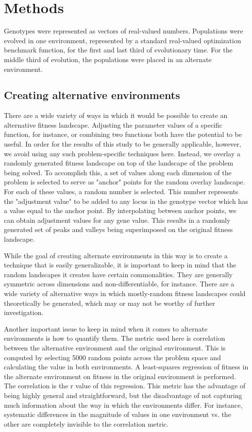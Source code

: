 \documentclass{sig-alternate}
\begin{document}
\section{Methods}
Genotypes were represented as vectors of real-valued numbers. Populations were evolved in one environment, represented by a standard real-valued optimization benchmark function, for the first and last third of evolutionary time. For the middle third of evolution, the populations were placed in an alternate environment.

\subsection{Creating alternative environments}
There are a wide variety of ways in which it would be possible to create an alternative fitness landscape. Adjusting the parameter values of a specific function, for instance, or combining two functions both have the potential to be useful. In order for the results of this study to be generally applicable, however, we avoid using any such problem-specific techniques here. Instead, we overlay a randomly generated fitness landscape on top of the landscape of the problem being solved. To accomplish this, a set of values along each dimension of the problem is selected to serve as "anchor" points for the random overlay landscape. For each of these values, a random number is selected. This number represents the "adjustment value" to be added to any locus in the genotype vector which has a value equal to the anchor point. By interpolating between anchor points, we can obtain adjustment values for any gene value. This results in a randomly generated set of peaks and valleys being superimposed on the original fitness landscape.

While the goal of creating alternate environments in this way is to create a technique that is easily generalizable, it is important to keep in mind that the random landscapes it creates have certain commonalities. They are generally symmetric across dimensions and non-differentiable, for instance.  There are a wide variety of alternative ways in which mostly-random fitness landscapes could theoretically be generated, which may or may not be worthy of further investigation. 

Another important issue to keep in mind when it comes to alternate environments is how to quantify them. The metric used here is correlation between the alternative environment and the original environment. This is computed by selecting 5000 random points across the problem space and calculating the value in both environments. A least-squares regression of fitness in the alternate environment on fitness in the original environment is performed. The correlation is the r value of this regression. This metric has the advantage of being highly general and straightforward, but the disadvantage of not capturing much information about the way in which the environments differ. For instance, systematic differences in the magnitude of values in one environment vs. the other are completely invisible to the correlation metric.
\end{document}
